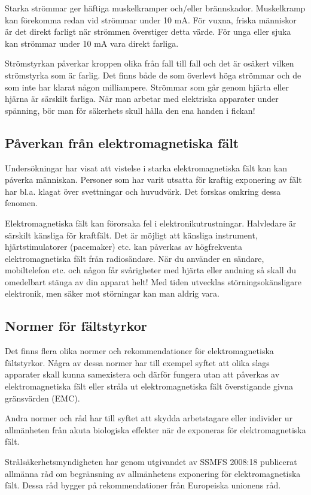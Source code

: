 Starka strömmar ger häftiga muskelkramper och/eller brännskador. Muskelkramp
kan förekomma redan vid strömmar under 10 mA. För vuxna, friska människor är
det direkt farligt när strömmen överstiger detta värde. För unga eller sjuka
kan strömmar under 10 mA vara direkt farliga.

Strömstyrkan påverkar kroppen olika från fall till fall och det är osäkert
vilken strömstyrka som är farlig. Det finns både de som överlevt höga strömmar
och de som inte har klarat någon milliampere. Strömmar som går genom hjärta
eller hjärna är särskilt farliga. När man arbetar med elektriska apparater
under spänning, bör man för säkerhets skull hålla den ena handen i fickan!

\subsection{Påverkan från elektromagnetiska fält}

Undersökningar har visat att vistelse i starka elektromagnetiska fält
kan kan påverka människan. Personer som har varit utsatta för kraftig
exponering av fält har bl.a. klagat över svettningar och
huvudvärk. Det forskas omkring dessa fenomen.

Elektromagnetiska fält kan förorsaka fel i
elektronikutrustningar. Halvledare är särskilt känsliga för
kraftfält. Det är möjligt att känsliga instrument, hjärtstimulatorer
(pacemaker) etc. kan påverkas av högfrekventa elektromagnetiska
fält från radiosändare. När du använder en sändare, mobiltelefon etc.
och någon får svårigheter med hjärta eller andning så skall du
omedelbart stänga av din apparat helt! Med tiden utvecklas
störningsokänsligare elektronik, men säker mot störningar kan man
aldrig vara.

\subsection{Normer för fältstyrkor}

Det finns flera olika normer och rekommendationer för elektromagnetiska
fältstyrkor. Några av dessa normer har till exempel syftet att olika slags
apparater skall kunna samexistera och därför fungera utan att påverkas av
elektromagnetiska fält eller stråla ut elektromagnetiska fält överstigande
givna gränsvärden (EMC).

Andra normer och råd har till syftet att skydda arbetstagare eller individer
ur allmänheten från akuta biologiska effekter när de exponeras för
elektromagnetiska fält.

Strålsäkerhetsmyndigheten har genom utgivandet av SSMFS 2008:18 publicerat
allmänna råd om begränsning av allmänhetens exponering för elektromagnetiska
fält. Dessa råd bygger på rekommendationer från Europeiska unionens råd. 
